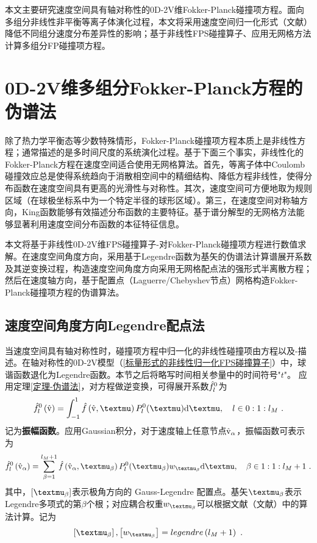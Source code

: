     本文主要研究速度空间具有轴对称性的0D-2V维Fokker-Planck碰撞项方程。面向多组分非线性非平衡等离子体演化过程，本文将采用速度空间归一化形式（文献）降低不同组分速度分布差异性的影响；基于非线性FPS碰撞算子、应用无网格方法计算多组分FP碰撞项方程。

\section{0D-2V维多组分Fokker-Planck方程的伪谱法}
\label{0D-2V维多组分Fokker-Planck方程的伪谱法}

   除了热力学平衡态等少数特殊情形，Fokker-Planck碰撞项方程本质上是非线性方程；通常描述的是多时间尺度的系统演化过程。基于下面三个事实，非线性化的Fokker-Planck方程在速度空间适合使用无网格算法。首先，等离子体中Coulomb碰撞效应总是使得系统趋向于消散相空间中的精细结构、降低方程非线性，使得分布函数在速度空间具有更高的光滑性与对称性。其次，速度空间可方便地取为规则区域（在球极坐标系中为一个特定半径的球形区域）。第三，在速度空间对称轴方向，King函数能够有效描述分布函数的主要特征。基于谱分解型的无网格方法能够显著利用速度空间分布函数的本征特征信息。
   
   本文将基于非线性0D-2V维FPS碰撞算子-对Fokker-Planck碰撞项方程进行数值求解。在速度空间角度方向，采用基于Legendre函数为基矢的伪谱法计算谱展开系数及其逆变换过程，构造速度空间角度方向采用无网格配点法的强形式半离散方程；然后在速度轴方向，基于配置点（Laguerre/Chebyshev节点）网格构造Fokker-Planck碰撞项方程的伪谱算法。
   
\subsection{速度空间角度方向Legendre配点法}
\label{速度空间角度方向Legendre配点法}

   当速度空间具有轴对称性时，碰撞项方程中归一化的非线性碰撞项由方程以及-描述。在轴对称性的0D-2V模型（\ref{标量形式的非线性归一化FPS碰撞算子}）中，球谐函数退化为Legendre函数。本节之后将略写时间相关参量中的时间符号"$t$"。
  应用定理\ref{定理-伪谱法}，对方程做逆变换，可得展开系数$\hat{f}_l^0$为
   \begin{eqnarray}
       \fhl \left(\rmvh \right) = \int_{-1}^1 \fh \left (\rmvh, \mu \right)   \Pl (\mu) \rmd \mu, \quad l \in 0:1:l_M ~. \label{fhlLegendre}
   \end{eqnarray}
  记为\textbf{振幅函数}。应用Gaussian积分，对于速度轴上任意节点${\hat{\mathrm{v}}}_\alpha$，振幅函数可表示为
   \begin{eqnarray}
       \fhl \left(\rmvha \right) = \sumbIlMI \fh \left (\rmvha, \mub \right)  \Pl (\mub) \wmub \rmd \mu, \quad \beta \in 1:1:l_M+1 ~. \label{fhlG}
   \end{eqnarray}
   其中，$[\mub]$表示极角方向的 Gauss-Legendre 配置点。基矢$\mub$表示 Legendre多项式的第$\beta$个根；对应耦合权重$\wmub$可以根据文献（文献）中的算法计算。记为
   \begin{eqnarray}
        \left[\mub \right],  \left[w_{\mub}\right] = legendre \left(l_M + 1 \right) ~. \label{muw-legendre}
   \end{eqnarray}

